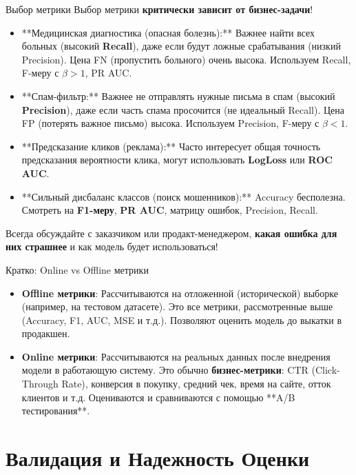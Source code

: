 \begin{alerttextbox}{Выбор метрики}
    Выбор метрики \textbf{критически зависит от бизнес-задачи}!
    \begin{itemize}
        \item **Медицинская диагностика (опасная болезнь):** Важнее найти всех больных (высокий \textbf{Recall}), даже если будут ложные срабатывания (низкий Precision). Цена FN (пропустить больного) очень высока. Используем Recall, F-меру с $\beta > 1$, PR AUC.
        \item **Спам-фильтр:** Важнее не отправлять нужные письма в спам (высокий \textbf{Precision}), даже если часть спама просочится (не идеальный Recall). Цена FP (потерять важное письмо) высока. Используем Precision, F-меру с $\beta < 1$.
        \item **Предсказание кликов (реклама):** Часто интересует общая точность предсказания вероятности клика, могут использовать \textbf{LogLoss} или \textbf{ROC AUC}.
        \item **Сильный дисбаланс классов (поиск мошенников):** Accuracy бесполезна. Смотреть на \textbf{F1-меру}, \textbf{PR AUC}, матрицу ошибок, Precision, Recall.
    \end{itemize}
    Всегда обсуждайте с заказчиком или продакт-менеджером, \textbf{какая ошибка для них страшнее} и как модель будет использоваться!
\end{alerttextbox}

\begin{myblock}{Кратко: Online vs Offline метрики}
    \begin{itemize}
        \item \textbf{Offline метрики}: Рассчитываются на отложенной (исторической) выборке (например, на тестовом датасете). Это все метрики, рассмотренные выше (Accuracy, F1, AUC, MSE и т.д.). Позволяют оценить модель до выкатки в продакшен.
        \item \textbf{Online метрики}: Рассчитываются на реальных данных после внедрения модели в работающую систему. Это обычно \textbf{бизнес-метрики}: CTR (Click-Through Rate), конверсия в покупку, средний чек, время на сайте, отток клиентов и т.д. Оцениваются и сравниваются с помощью **A/B тестирования**.
    \end{itemize}
\end{myblock}

\section{Валидация и Надежность Оценки}

